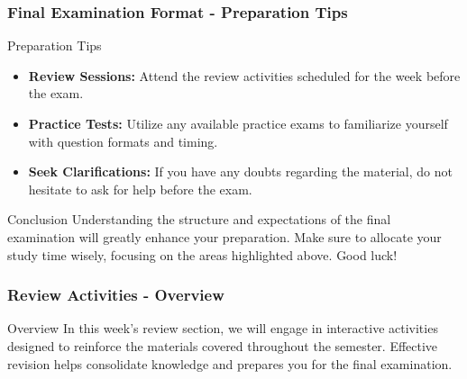 \documentclass[aspectratio=169]{beamer}
\begin{document}
\begin{frame}[fragile]
    \frametitle{Final Examination Format - Preparation Tips}
    \begin{block}{Preparation Tips}
        \begin{itemize}
            \item \textbf{Review Sessions:} Attend the review activities scheduled for the week before the exam.
            \item \textbf{Practice Tests:} Utilize any available practice exams to familiarize yourself with question formats and timing.
            \item \textbf{Seek Clarifications:} If you have any doubts regarding the material, do not hesitate to ask for help before the exam.
        \end{itemize}
    \end{block}

    \begin{block}{Conclusion}
        Understanding the structure and expectations of the final examination will greatly enhance your preparation. Make sure to allocate your study time wisely, focusing on the areas highlighted above. Good luck!
    \end{block}
\end{frame}

\begin{frame}[fragile]
    \frametitle{Review Activities - Overview}
    \begin{block}{Overview}
        In this week’s review section, we will engage in interactive activities designed to reinforce the materials covered throughout the semester. Effective revision helps consolidate knowledge and prepares you for the final examination.
    \end{block}
\end{frame}
\end{document}
